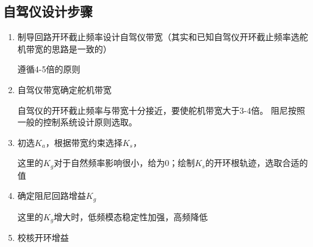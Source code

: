 \subsection{自驾仪设计步骤}
\begin{enumerate}
    \item 制导回路开环截止频率设计自驾仪带宽（其实和已知自驾仪开环截止频率选舵机带宽的思路是一致的）
    
    {\kaishu 遵循4-5倍的原则}
    \item 自驾仪带宽确定舵机带宽
    
    {\kaishu 自驾仪的开环截止频率与带宽十分接近，要使舵机带宽大于3-4倍。
    阻尼按照一般的控制系统设计原则选取。}
    \item 初选$K_a$，根据带宽约束选择$K_s$，
    
    {\kaishu 这里的$K_g$对于自然频率影响很小，给为0；绘制$K_s$的开环根轨迹，选取合适的值}
    \item 确定阻尼回路增益$K_g$
    
    {\kaishu 这里的$K_g$增大时，低频模态稳定性加强，高频降低}

    \item 校核开环增益
\end{enumerate}




